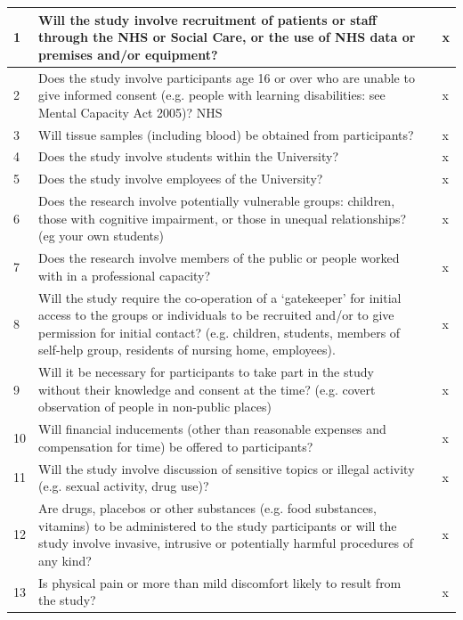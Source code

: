 \documentclass{article}
\begin{document}
\begin{longtable}[H]{|l|p{13cm}|l|l|}
\small

1 & Will the   study involve recruitment of patients or staff through the NHS or Social   Care, or the use of NHS data or premises and/or equipment? &  & x \\ \hline
2 & Does the   study involve participants age 16 or over who are unable to give informed   consent (e.g. people with learning disabilities: see Mental Capacity Act   2005)? NHS &  & x \\ \hline
3 & Will   tissue samples (including blood) be obtained from participants? &  & x \\ \hline
4 & Does the   study involve students within the University? &  & x \\ \hline
5 & Does the   study involve employees of the University? &  & x \\ \hline
6 & Does the   research involve potentially vulnerable groups: children, those with   cognitive impairment, or those in unequal relationships? (eg your own   students) &  & x \\ \hline
7 & Does the   research involve members of the public or people worked with in a   professional capacity? &  & x \\ \hline
8 & Will the   study require the co-operation of a ‘gatekeeper’ for initial access to the   groups or individuals to be recruited and/or to give permission for initial   contact? (e.g. children, students, members of self-help group, residents of   nursing home, employees). &  & x \\ \hline
9 & Will it   be necessary for participants to take part in the study without their   knowledge and consent at the time? (e.g. covert observation of people in   non-public places) &  & x \\ \hline
10 & Will   financial inducements (other than reasonable expenses and compensation for   time) be offered to participants? &  & x \\ \hline
11 & Will the   study involve discussion of sensitive topics or illegal activity (e.g. sexual   activity, drug use)? &  & x \\ \hline
12 & Are   drugs, placebos or other substances (e.g. food substances, vitamins) to be   administered to the study participants or will the study involve invasive,   intrusive or potentially harmful procedures of any kind? &  & x \\ \hline
13 & Is   physical pain or more than mild discomfort likely to result from the study? &  & x \\ \hline

\end{longtable}
\end{document}
